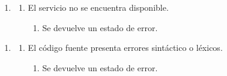\begin{description}
\begin{enumerate}
      \item 
      \begin {enumerate}
         \setcounter{enumii}{0}
         \item El servicio no se encuentra disponible.
         \begin{enumerate}
         \item Se devuelve un estado de error.
         \end{enumerate}
      \end{enumerate}
   \end{enumerate}
   \begin{enumerate} \itemsep1pt \parskip0pt 
   \setcounter{enumi}{2}
   \renewcommand{\labelenumi}{}
   \renewcommand{\labelenumiii}{\arabic{enumiii}.}
   \renewcommand{\labelenumii}{\arabic{enumi}\alph{enumii}.}
      \item 
      \begin {enumerate}
         \setcounter{enumii}{0}
         \item El código fuente presenta errores sintáctico o léxicos.
         \begin{enumerate}
         \item Se devuelve un estado de error. 
         \end{enumerate}
      \end{enumerate}
   \end{enumerate}
\end{description}



